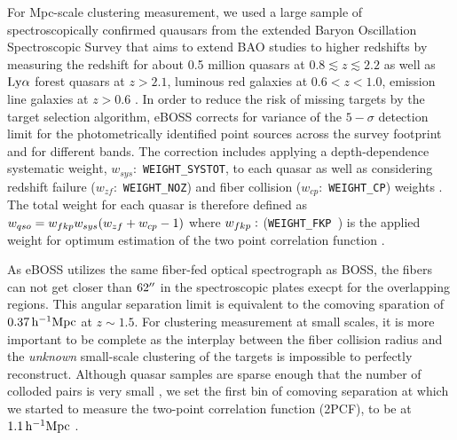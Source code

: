 \documentclass[useAMS,usenatbib]{mn2e}
\begin{document}
For Mpc-scale clustering measurement, we used a large sample of spectroscopically confirmed quausars from the extended Baryon Oscillation Spectroscopic Survey \citep[eBOSS;][]{daw16} that aims to extend BAO studies to higher redshifts by measuring the redshift for about 0.5 million quasars at $0.8\lesssim z \lesssim 2.2$ as well as $\rm Ly\alpha$ forest quasars at $z>2.1$, luminous red galaxies at $0.6<z<1.0$, emission line galaxies at $z>0.6$ \citep[see ][for target selection criteria and process]{my15}. In order to reduce the risk of missing targets by the target selection algorithm, eBOSS corrects for variance of the $5-\sigma$ detection limit for the photometrically identified point sources across the survey footprint and for different bands. The correction includes applying a depth-dependence systematic weight, $w_{sys}:$ {\tt WEIGHT\_SYSTOT}, to each quasar as well as considering redshift failure ($w_{zf}:$ {\tt WEIGHT\_NOZ}) and fiber collision ($w_{cp}:$ {\tt WEIGHT\_CP}) weights \citep[see, ][for detail of the weight determination]{la17,rod17,bp17,an12,ross12}. The total weight for each quasar is therefore defined as $w_{qso} = w_{\sc fkp}w_{sys}(w_{zf}+w_{cp}-1)$ where $w_{\sc fkp}:$ ({\tt WEIGHT\_FKP  }) is the applied weight for optimum estimation of the two point correlation function \citep[see, ][]{fkp94}.


As eBOSS utilizes the same fiber-fed optical spectrograph as BOSS, the fibers can not get closer than $62 \arcsec$ in the spectroscopic plates execpt for the overlapping regions\citep{bl03}. This angular separation limit is equivalent to the comoving sparation of $0.37\, \rm h^{-1}Mpc$ at $z\sim 1.5$. For clustering measurement at small scales, it is more important to be complete as the interplay between the fiber collision radius and the {\it unknown} small-scale clustering of the targets is impossible to perfectly reconstruct. Although quasar samples are sparse enough that the number of colloded pairs is very small \citep[e.g.,][]{rod17}, we set the first bin of comoving separation at which we started to measure the two-point correlation function (2PCF), to be at $1.1 \, \rm h^{-1}Mpc$ \citep[see, e. g., ][for studies on the efficiency of fiber collision corrections at small scales]{gu12,ha17}. 
\end{document}
